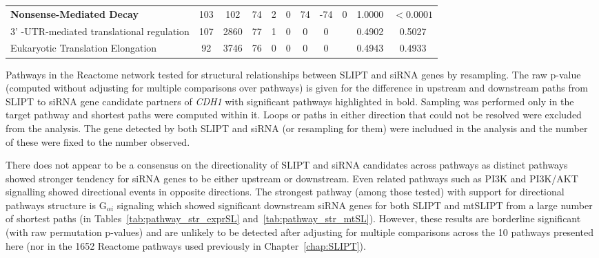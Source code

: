 \begin{table*}[!htb]
{{\begin{threeparttable}
\begin{tabular}{l|cc|cc|cccc|cc}
\rowcolor{black!5}
\textbf{Nonsense-Mediated Decay}                   & 103         & 102          & 74            & 2           & 0    & 74   & -74     & 0            & 1.0000             & $<0.0001$                   \\
\rowcolor{black!10}
3' -UTR-mediated translational regulation & 107         & 2860         & 77            & 1           & 0    & 0    & 0       &              & 0.4902             & 0.5027              \\
\rowcolor{black!5}
Eukaryotic Translation Elongation         & 92          & 3746         & 76            & 0           & 0    & 0    & 0       &              & 0.4943             & 0.4933              \\
\hline
\end{tabular}
\begin{tablenotes}
\raggedright \small
Pathways in the Reactome network tested for structural relationships between \gls{SLIPT} and \gls{siRNA} genes by resampling. The raw p-value (computed without adjusting for multiple comparisons over pathways) is given for the difference in upstream and downstream paths from \gls{SLIPT} to \gls{siRNA} gene candidate partners of \textit{CDH1} with significant pathways highlighted in bold. Sampling was performed only in the target pathway and shortest paths were computed within it. Loops or paths in either direction that could not be resolved were excluded from the analysis. The gene detected by both \gls{SLIPT} and \gls{siRNA} (or resampling for them) were includued in the analysis and the number of these were fixed to the number observed.
\end{tablenotes}
\end{threeparttable}
}
}
\end{table*}

There does not appear to be a consensus on the directionality of \gls{SLIPT} and \gls{siRNA} candidates across pathways as distinct pathways showed stronger tendency for \gls{siRNA} genes to be either upstream or downstream. Even related pathways such as \gls{PI3K} and PI3K/AKT signalling showed directional events in opposite directions. The strongest pathway (among those tested) with support for directional pathways structure is G$_{\alpha i}$ signaling which showed significant downstream \gls{siRNA} genes for both SLIPT and mtSLIPT from a large number of shortest paths (in Tables~\ref{tab:pathway_str_exprSL} and~\ref{tab:pathway_str_mtSL}). However, these results are borderline significant (with raw permutation p-values) and are unlikely to be detected after adjusting for multiple comparisons across the 10 pathways presented here (nor in the 1652 Reactome pathways used previously in Chapter~\ref{chap:SLIPT}).


